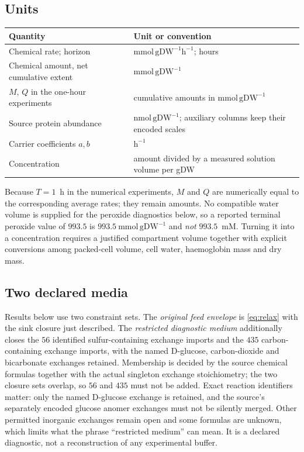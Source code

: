 \documentclass[11pt,a4paper]{article}
\theoremstyle{plain}
\theoremstyle{definition}
\theoremstyle{remark}
\newcommand{\mmolg}{\mathrm{mmol}\,\mathrm{gDW}^{-1}}
\begin{document}
\subsection{Units}
\begin{center}
\small
\begin{tabular}{@{}ll@{}}
\toprule
Quantity & Unit or convention \\
\midrule
Chemical rate; horizon & $\mathrm{mmol}\,\mathrm{gDW}^{-1}\mathrm h^{-1}$; hours \\
Chemical amount, net cumulative extent & $\mmolg$ \\
$M$, $Q$ in the one-hour experiments & cumulative amounts in $\mmolg$ \\
Source protein abundance & $\mathrm{nmol}\,\mathrm{gDW}^{-1}$; auxiliary columns keep their encoded scales \\
Carrier coefficients $a,b$ & $\mathrm h^{-1}$ \\
Concentration & amount divided by a measured solution volume per gDW \\
\bottomrule
\end{tabular}
\end{center}

Because $T=1$~h in the numerical experiments, $M$ and $Q$ are numerically equal
to the corresponding average rates; they remain amounts. No compatible water
volume is supplied for the peroxide diagnostics below, so a reported terminal
peroxide value of $993.5$ is $993.5\ \mmolg$ and \emph{not} $993.5$~mM. Turning
it into a concentration requires a justified compartment volume together with
explicit conversions among packed-cell volume, cell water, haemoglobin mass and
dry mass.

\subsection{Two declared media}\label{sec:media}
Results below use two constraint sets. The \emph{original feed envelope} is
\eqref{eq:relax} with the sink closure just described. The \emph{restricted
diagnostic medium} additionally closes the $56$ identified sulfur-containing
exchange imports and the $435$ carbon-containing exchange imports, with the
named D-glucose, carbon-dioxide and bicarbonate exchanges retained. Membership
is decided by the source chemical formulas together with the actual singleton
exchange stoichiometry; the two closure sets overlap, so $56$ and $435$ must
not be added. Exact reaction identifiers matter: only the named D-glucose
exchange  is retained, and the source's separately encoded
glucose anomer exchanges must not be silently merged. Other permitted inorganic
exchanges remain open and some formulas are unknown, which limits what the
phrase ``restricted medium'' can mean. It is a declared diagnostic, not a
reconstruction of any experimental buffer.
\end{document}
